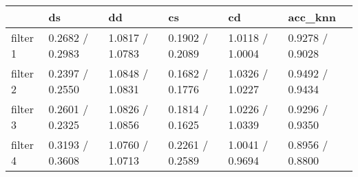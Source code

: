 \begin{tabular}{llllll}
\toprule
{} &               ds &               dd &               cs &               cd &          acc\_knn \\
\midrule
filter 1 &  0.2682 / 0.2983 &  1.0817 / 1.0783 &  0.1902 / 0.2089 &  1.0118 / 1.0004 &  0.9278 / 0.9028 \\
filter 2 &  0.2397 / 0.2550 &  1.0848 / 1.0831 &  0.1682 / 0.1776 &  1.0326 / 1.0227 &  0.9492 / 0.9434 \\
filter 3 &  0.2601 / 0.2325 &  1.0826 / 1.0856 &  0.1814 / 0.1625 &  1.0226 / 1.0339 &  0.9296 / 0.9350 \\
filter 4 &  0.3193 / 0.3608 &  1.0760 / 1.0713 &  0.2261 / 0.2589 &  1.0041 / 0.9694 &  0.8956 / 0.8800 \\
\bottomrule
\end{tabular}
